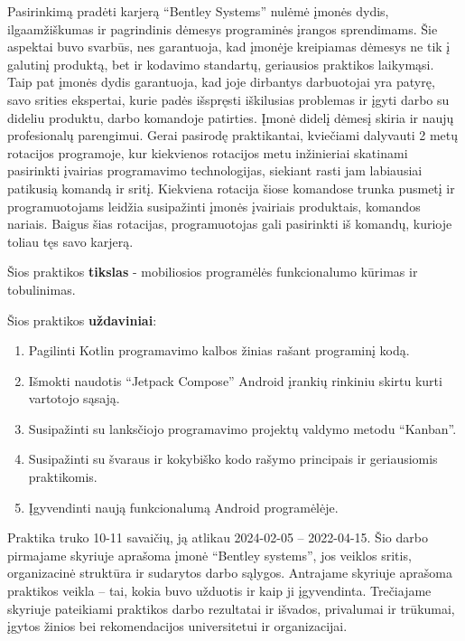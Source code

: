 Pasirinkimą pradėti karjerą \enquote{Bentley Systems} nulėmė įmonės dydis, ilgaamžiškumas ir pagrindinis dėmesys programinės įrangos sprendimams. Šie aspektai buvo svarbūs, nes garantuoja, kad įmonėje kreipiamas dėmesys ne tik į galutinį produktą, bet ir kodavimo standartų, geriausios praktikos laikymąsi. Taip pat įmonės dydis garantuoja, kad joje dirbantys darbuotojai yra patyrę, savo srities ekspertai, kurie padės išspręsti iškilusias problemas ir įgyti darbo su dideliu produktu, darbo komandoje patirties. Įmonė didelį dėmesį skiria ir naujų profesionalų parengimui. Gerai pasirodę praktikantai, kviečiami dalyvauti 2 metų rotacijos programoje, kur kiekvienos rotacijos metu inžinieriai skatinami pasirinkti įvairias programavimo technologijas, siekiant rasti jam labiausiai patikusią komandą ir sritį.
Kiekviena rotacija šiose komandose trunka pusmetį ir programuotojams leidžia  susipažinti įmonės įvairiais produktais, komandos nariais. Baigus šias rotacijas, programuotojas gali pasirinkti iš komandų, kurioje toliau tęs savo karjerą.
\bigskip

Šios praktikos \textbf{tikslas} - mobiliosios programėlės funkcionalumo kūrimas ir tobulinimas.
\bigskip

Šios praktikos \textbf{uždaviniai}:
\begin{enumerate}
    \item Pagilinti Kotlin programavimo kalbos žinias rašant programinį kodą.
    \item Išmokti naudotis “Jetpack Compose” Android įrankių rinkiniu skirtu kurti vartotojo sąsają.
    \item Susipažinti su lanksčiojo programavimo projektų valdymo metodu “Kanban”.
    \item Susipažinti su švaraus ir kokybiško kodo rašymo principais ir geriausiomis praktikomis. 
    \item Įgyvendinti naują funkcionalumą Android programėlėje.
\end{enumerate}
\bigskip

Praktika truko 10-11 savaičių, ją atlikau 2024-02-05 -- 2022-04-15.
\bigskip
Šio darbo pirmajame skyriuje aprašoma įmonė \enquote{Bentley systems}, jos veiklos sritis, organizacinė struktūra ir sudarytos darbo sąlygos. Antrajame skyriuje aprašoma praktikos veikla -- tai, kokia buvo užduotis ir kaip ji įgyvendinta. Trečiajame skyriuje pateikiami praktikos darbo rezultatai ir išvados, privalumai ir trūkumai, įgytos žinios bei rekomendacijos universitetui ir organizacijai.
